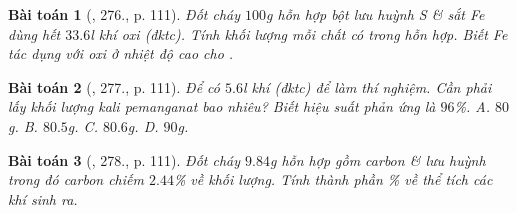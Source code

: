 \documentclass{article}
\newtheorem{baitoan}{Bài toán}
\begin{document}
\begin{baitoan}[\cite{An_400_BT_Hoa_Hoc_8_2020}, 276., p. 111]
	Đốt cháy $100$\emph{g} hỗn hợp bột lưu huỳnh \emph{S} \& sắt \emph{Fe} dùng hết $33.6$\emph{l} khí oxi (đktc). Tính khối lượng mỗi chất có trong hỗn hợp. Biết \emph{Fe} tác dụng với oxi ở nhiệt độ cao cho \emph{}.
\end{baitoan}

\begin{baitoan}[\cite{An_400_BT_Hoa_Hoc_8_2020}, 277., p. 111]
	Để có $5.6$\emph{l} khí \emph{} (đktc) để làm thí nghiệm. Cần phải lấy khối lượng kali pemanganat \emph{} bao nhiêu? Biết hiệu suất phản ứng là $96$\%. {\sf A.} $80$\emph{g}. {\sf B.} $80.5$\emph{g}. {\sf C.} $80.6$\emph{g}. {\sf D.} $90$\emph{g}.
\end{baitoan}

\begin{baitoan}[\cite{An_400_BT_Hoa_Hoc_8_2020}, 278., p. 111]
	Đốt cháy $9.84$\emph{g} hỗn hợp gồm carbon \& lưu huỳnh trong đó carbon chiếm $2.44$\% về khối lượng. Tính thành phần \% về thể tích các khí sinh ra.
\end{baitoan}


\printbibliography[heading=bibintoc]
	
\end{document}
